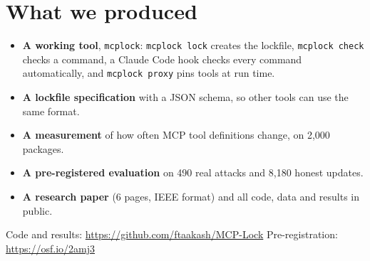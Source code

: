\documentclass[11pt,a4paper]{article}
\newcommand{\code}[1]{\texttt{#1}}
\begin{document}
\section{What we produced}
\begin{itemize}
  \item \textbf{A working tool}, \code{mcplock}: \code{mcplock lock} creates the lockfile, \code{mcplock check}
        checks a command, a Claude Code hook checks every command automatically, and \code{mcplock proxy} pins tools
        at run time.
  \item \textbf{A lockfile specification} with a JSON schema, so other tools can use the same format.
  \item \textbf{A measurement} of how often MCP tool definitions change, on 2,000 packages.
  \item \textbf{A pre-registered evaluation} on 490 real attacks and 8,180 honest updates.
  \item \textbf{A research paper} (6 pages, IEEE format) and all code, data and results in public.
\end{itemize}

Code and results: \url{https://github.com/ftaakash/MCP-Lock} \quad Pre-registration: \url{https://osf.io/2amj3}

\end{document}
